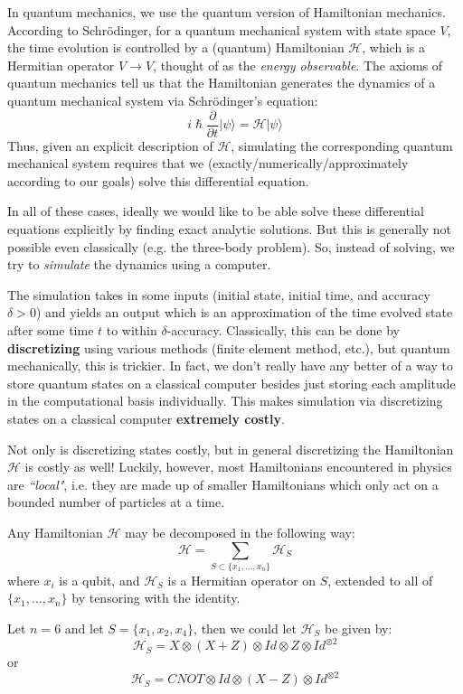 \documentclass{article}
\begin{document}
In quantum mechanics, we use the quantum version of Hamiltonian mechanics. According to Schr\"odinger, for a quantum mechanical system with state space $V$, the time evolution is controlled by a (quantum) Hamiltonian $\mathcal H$, which is a Hermitian operator $V\to V$, thought of as the \textit{energy observable}. The axioms of quantum mechanics tell us that the Hamiltonian generates the dynamics of a quantum mechanical system via Schr\"odinger's equation: $$i\hslash \frac{\partial}{\partial t}|\psi\rangle = \mathcal H|\psi\rangle$$
Thus, given an explicit description of $\mathcal{H}$, simulating the corresponding quantum mechanical system requires that we (exactly/numerically/approximately according to our goals) solve this differential equation.

In all of these cases, ideally we would like to be able solve these differential equations explicitly by finding exact analytic solutions.  But this is generally not possible even classically (e.g. the three-body problem). So, instead of solving, we try to \textit{simulate} the dynamics using a computer.

The simulation takes in some inputs (initial state, initial time, and accuracy $\delta>0$) and yields an output which is an approximation of the time evolved state after some time $t$ to within $\delta$-accuracy. Classically, this can be done by \textbf{discretizing} using various methods (finite element method, etc.), but quantum mechanically, this is trickier. In fact, we don't really have any better of a way to store quantum states on a classical computer besides just storing each amplitude in the computational basis individually. This makes simulation via discretizing states on a classical computer \textbf{extremely costly}.

Not only is discretizing states costly, but in general discretizing the Hamiltonian $\mathcal H$ is costly as well! Luckily, however, most Hamiltonians encountered in physics are \textit{``local"}, i.e. they are made up of smaller Hamiltonians which only act on a bounded number of particles at a time.

\begin{mdframed}
    Any Hamiltonian $\mathcal H$ may be decomposed in the following way: $$\mathcal H = \sum_{S\subset\{x_1,\dots ,x_n\}}\mathcal H_S$$ where $x_i$ is a qubit, and $\mathcal H_S$ is a Hermitian operator on $S$, extended to all of $\{x_1,\dots ,x_n\}$ by tensoring with the identity.

\vspace{0.5cm}

 Let $n = 6$ and let $S = \{x_1,x_2,x_4\}$, then we could let $\mathcal H_S$ be given by: $$\mathcal H_S = X\otimes (X+Z)\otimes Id\otimes Z\otimes Id^{\otimes 2}$$ or $$\mathcal H_S = CNOT \otimes Id\otimes (X-Z)\otimes Id^{\otimes 2}$$
\end{mdframed}
\end{document}
